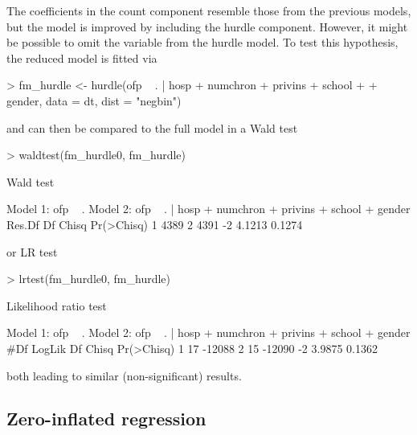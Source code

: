 \documentclass{Z}
\begin{document}
The coefficients in the count component resemble those from the previous
models, but the model is improved by including the hurdle component.
However, it might be possible to omit the  variable from
the hurdle model. To test this hypothesis, the reduced model is fitted
via
\begin{Schunk}
\begin{Sinput}
> fm_hurdle <- hurdle(ofp ~ . | hosp + numchron + privins + school + 
+     gender, data = dt, dist = "negbin")
\end{Sinput}
\end{Schunk}
and can then be compared to the full model in a Wald test
\begin{Schunk}
\begin{Sinput}
> waldtest(fm_hurdle0, fm_hurdle)
\end{Sinput}
\begin{Soutput}
Wald test

Model 1: ofp ~ .
Model 2: ofp ~ . | hosp + numchron + privins + school + gender
  Res.Df   Df  Chisq Pr(>Chisq)
1   4389                       
2   4391   -2 4.1213     0.1274
\end{Soutput}
\end{Schunk}
or LR test
\begin{Schunk}
\begin{Sinput}
> lrtest(fm_hurdle0, fm_hurdle)
\end{Sinput}
\begin{Soutput}
Likelihood ratio test

Model 1: ofp ~ .
Model 2: ofp ~ . | hosp + numchron + privins + school + gender
  #Df LogLik Df  Chisq Pr(>Chisq)
1  17 -12088                     
2  15 -12090 -2 3.9875     0.1362
\end{Soutput}
\end{Schunk}
both leading to similar (non-significant) results.


\subsection{Zero-inflated regression}
\end{document}
